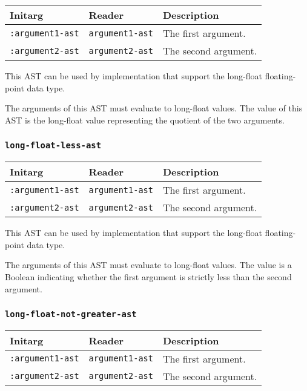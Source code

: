 \begin{tabular}{|l|l|l|}
\hline
Initarg & Reader & Description\\
\hline\hline
\texttt{:argument1-ast} & \texttt{argument1-ast} & The first argument.\\
\hline
\texttt{:argument2-ast} & \texttt{argument2-ast} & The second argument.\\
\hline
\end{tabular}

This AST can be used by implementation that support the long-float
floating-point data type.  

The arguments of this AST must evaluate to long-float
values.  The value of this AST is the long-float value
representing the quotient of the two arguments.

\subsubsection{\texttt{long-float-less-ast}}
\label{sec-ast-long-float-less}

\begin{tabular}{|l|l|l|}
\hline
Initarg & Reader & Description\\
\hline\hline
\texttt{:argument1-ast} & \texttt{argument1-ast} & The first argument.\\
\hline
\texttt{:argument2-ast} & \texttt{argument2-ast} & The second argument.\\
\hline
\end{tabular}

This AST can be used by implementation that support the long-float
floating-point data type.  

The arguments of this AST must evaluate to long-float
values.  The value is a Boolean indicating whether the first argument
is strictly less than the second argument.

\subsubsection{\texttt{long-float-not-greater-ast}}
\label{sec-ast-long-float-not-greater}

\begin{tabular}{|l|l|l|}
\hline
Initarg & Reader & Description\\
\hline\hline
\texttt{:argument1-ast} & \texttt{argument1-ast} & The first argument.\\
\hline
\texttt{:argument2-ast} & \texttt{argument2-ast} & The second argument.\\
\hline
\end{tabular}

